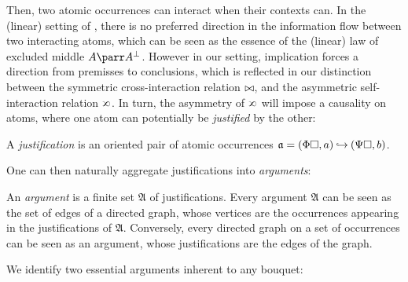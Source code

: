 Then, two atomic occurrences can interact when their contexts can. In the
(linear)  setting of \cite{lmcs:1089}, there is no preferred direction
in the information flow between two interacting atoms, which can be seen as the
essence of the (linear) law of excluded middle $A \parr A^\bot$. However in our
 setting, implication forces a direction from premisses to
conclusions, which is reflected in our distinction between the symmetric
cross-interaction relation $\mathbin{\bowtie}$, and the asymmetric self-interaction
relation $\sinter$. In turn, the asymmetry of
$\sinter$ will impose a causality on atoms, where one atom can potentially be
\emph{justified} by the other:

\begin{definition}[Justification]
  
  A \emph{justification} is an oriented pair of atomic occurrences $\mathfrak{a}
  = (\Phi\square, a) \mathbin{\hookrightarrow} (\Psi\square, b)$.
\end{definition}

One can then naturally aggregate justifications into \emph{arguments}:

\begin{definition}[Argument]
  
  An \emph{argument} is a finite set $\mathfrak{A}$ of justifications. Every
  argument $\mathfrak{A}$ can be seen as the set of edges of a directed graph,
  whose vertices are the occurrences appearing in the justifications of
  $\mathfrak{A}$. Conversely, every directed graph on a set of occurrences can
  be seen as an argument, whose justifications are the edges of the graph.
\end{definition}

We identify two essential arguments inherent to any bouquet:


